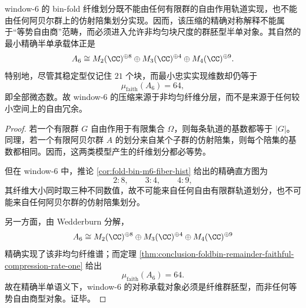 

\begin{theorem}\label{thm:conclusion-window6-groupoid-rather-than-free-quotient}
window-\(6\) 的 bin-fold 纤维划分既不能由任何有限群的自由作用轨道实现，也不能由任何阿贝尔群上的仿射陪集划分实现。因而，该压缩的精确对称解释不能属于“等势自由商”范畴，而必须进入允许非均匀块尺度的群胚型半单对象。其自然的最小精确半单承载体正是
\[
A_6
\cong
M_2(\CC)^{\oplus 8}\oplus M_3(\CC)^{\oplus 4}\oplus M_4(\CC)^{\oplus 9}.
\]
特别地，尽管其稳定型仅记住 \(21\) 个块，而最小忠实实现维数却仍等于
\[
\mu_{\mathrm{faith}}(A_6)=64,
\]
即全部微态数。故 window-\(6\) 的压缩来源于非均匀纤维分层，而不是来源于任何较小空间上的自由冗余。
\end{theorem}
\begin{proof}
若一个有限群 \(G\) 自由作用于有限集合 \(\Omega\)，则每条轨道的基数都等于 \(|G|\)。同理，若一个有限阿贝尔群 \(A\) 的划分来自某个子群的仿射陪集，则每个陪集的基数都相同。因而，这两类模型产生的纤维划分都必等势。

但在 window-\(6\) 中，推论 \ref{cor:fold-bin-m6-fiber-hist} 给出的精确直方图为
\[
2:8,\qquad 3:4,\qquad 4:9,
\]
其纤维大小同时取三种不同数值，故不可能来自任何自由有限群轨道划分，也不可能来自任何阿贝尔群的仿射陪集划分。

另一方面，由 Wedderburn 分解，
\[
A_6\cong M_2(\CC)^{\oplus 8}\oplus M_3(\CC)^{\oplus 4}\oplus M_4(\CC)^{\oplus 9}
\]
精确实现了该非均匀纤维谱；而定理 \ref{thm:conclusion-foldbin-remainder-faithful-compression-rate-one} 给出
\[
\mu_{\mathrm{faith}}(A_6)=64.
\]
故在精确半单语义下，window-\(6\) 的对称承载对象必须是纤维群胚型，而非任何等势自由商型对象。证毕。
\end{proof}


